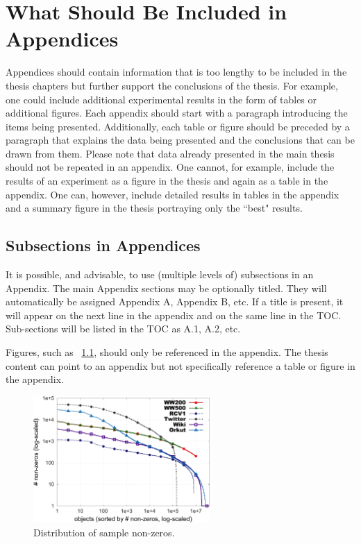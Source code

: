 \appendix
\renewcommand{\thesubsection}{\Alph{subsection}}

\chapter{What Should Be Included in Appendices}\label{apx:appendix1}

Appendices should contain information that is too lengthy to be included in the thesis chapters but further support the conclusions of the thesis. For example, one could include additional experimental results in the form of tables or additional figures. Each appendix should start with a paragraph introducing the items being presented. Additionally, each table or figure should be preceded by a paragraph that explains the data being presented and the conclusions that can be drawn from them. Please note that data already presented in the main thesis should not be repeated in an appendix. One cannot, for example, include the results of an experiment as a figure in the thesis and again as a table in the appendix. One can, however, include detailed results in tables in the appendix and a summary figure in the thesis portraying only the ``best" results.

\section{Subsections in Appendices}\label{apx:appendix1:subsections}

It is possible, and advisable, to use (multiple levels of) subsections in an Appendix. The main Appendix sections may be optionally titled. They will automatically be assigned Appendix A, Appendix B, etc. If a title is present, it will appear on the next line in the appendix and on the same line in the TOC. Sub-sections will be listed in the TOC as A.1, A.2, etc.

Figures, such as \figurename~\ref{fig:nonzero-distr}, should only be referenced in the appendix. The thesis content can point to an appendix but not specifically reference a table or figure in the appendix.

\begin{figure}[!htb]
  \centering
  \includegraphics[width=0.6\textwidth]{img/hist-rows.pdf}
  \caption{Distribution of sample non-zeros.}
  \label{fig:nonzero-distr}
\end{figure}


